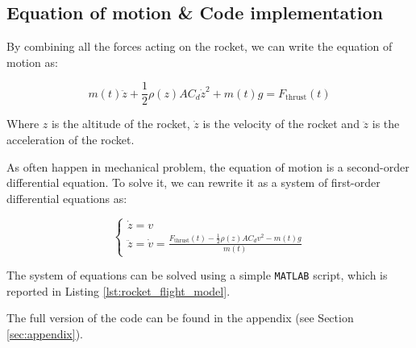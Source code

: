 \subsection{Equation of motion \& Code implementation}
\label{subsec:equation_of_motion}

By combining all the forces acting on the rocket, we can write the equation of motion as:

\begin{equation}
    m(t) \ddot{z} + \frac{1}{2} \rho(z) A C_d \dot{z}^2 + m(t) g = F_{\text{thrust}}(t)
    \label{eq:equation_of_motion}
\end{equation}

Where $z$ is the altitude of the rocket, $\dot{z}$ is the velocity of the rocket and $\ddot{z}$ is the acceleration of the rocket.

As often happen in mechanical problem, the equation of motion is a second-order differential equation.
To solve it, we can rewrite it as a system of first-order differential equations as:

\begin{equation}
    \begin{cases}
        \dot{z} = v \\
        \ddot{z} = \dot{v} = \frac{F_{\text{thrust}}(t) - \frac{1}{2} \rho(z) A C_d v^2 - m(t) g}{m(t)}
    \end{cases}
\end{equation}

The system of equations can be solved using a simple \texttt{MATLAB} script, which is reported in Listing \ref{lst:rocket_flight_model}.



The full version of the code can be found in the appendix (see Section \ref{sec:appendix}).